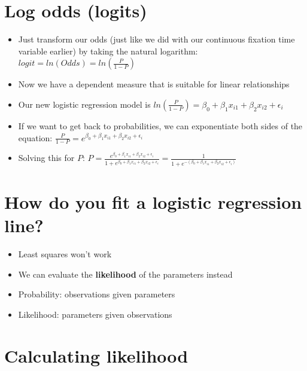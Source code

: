 \documentclass[]{article}
\begin{document}
\section{Log odds (logits)}\label{log-odds-logits}

\begin{itemize}
\itemsep1pt\parskip0pt
\item
  Just transform our odds (just like we did with our continuous fixation
  time variable earlier) by taking the natural logarithm:
  $logit = ln(Odds) = ln(\frac{P}{1-P})$
\item
  Now we have a dependent measure that is suitable for linear
  relationships
\item
  Our new logistic regression model is
  $ln(\frac{P}{1-P}) = \beta_0 + \beta_1 x_{i1} + \beta_2 x_{i2} + \epsilon_i$
\item
  If we want to get back to probabilities, we can exponentiate both
  sides of the equation:
  $\frac{P}{1-P} = e^{\beta_0 + \beta_1 x_{i1} + \beta_2 x_{i2} + \epsilon_i}$
\item
  Solving this for $P$:
  $P = \frac{e^{\beta_0 + \beta_1 x_{i1} + \beta_2 x_{i2} + \epsilon_i}}{1 + e^{\beta_0 + \beta_1 x_{i1} + \beta_2 x_{i2} + \epsilon_i}} = \frac{1}{1 + e^{-(\beta_0 + \beta_1 x_{i1} + \beta_2 x_{i2} + \epsilon_i)}}$
\end{itemize}

\section{How do you fit a logistic regression
line?}\label{how-do-you-fit-a-logistic-regression-line}

\begin{itemize}
\itemsep1pt\parskip0pt
\item
  Least squares won't work
\item
  We can evaluate the \textbf{likelihood} of the parameters instead
\item
  Probability: observations given parameters
\item
  Likelihood: parameters given observations
\end{itemize}

\section{Calculating likelihood}\label{calculating-likelihood}
\end{document}
